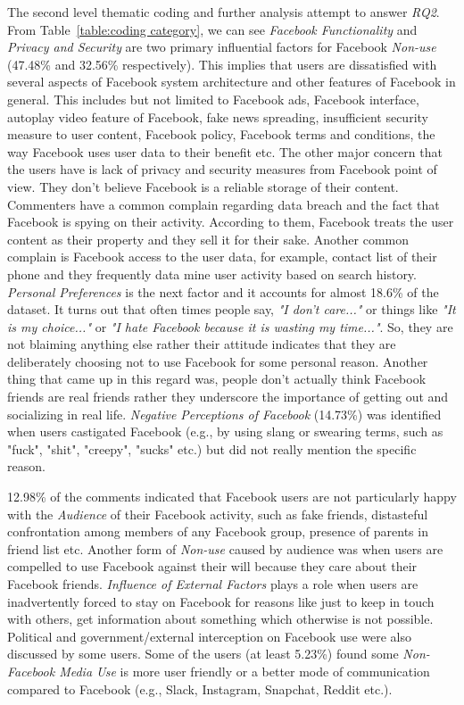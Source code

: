 The second level thematic coding and further analysis attempt to answer \emph{RQ2}. From Table~\ref{table:coding category}, we can see \textit{Facebook Functionality} and \textit{Privacy and Security} are two primary influential factors for Facebook \textit{Non-use} (47.48\% and 32.56\% respectively). This implies that users are dissatisfied with several aspects of Facebook system architecture and other features of Facebook in general. This includes but not limited to Facebook ads, Facebook interface, autoplay video feature of Facebook, fake news spreading, insufficient security measure to user content, Facebook policy, Facebook terms and conditions, the way Facebook uses user data to their benefit etc. The other major concern that the users have is lack of privacy and security measures from Facebook point of view. They don't believe Facebook is a reliable storage of their content. Commenters have a common complain regarding data breach and the fact that Facebook is spying on their activity. According to them, Facebook treats the user content as their property and they sell it for their sake. Another common complain is Facebook access to the user data, for example, contact list of their phone and they frequently data mine user activity based on search history. \textit{Personal Preferences} is the next factor and it accounts for almost 18.6\% of the dataset. It turns out that often times people say, \textit{"I don't care..."} or things like \textit{"It is my choice..."} or \textit{"I hate Facebook because it is wasting my time..."}. So, they are not blaiming anything else rather their attitude indicates that they are deliberately choosing not to use Facebook for some personal reason. Another thing that came up in this regard was, people don't actually think Facebook friends are real friends rather they underscore the importance of getting out and socializing in real life. \textit{Negative Perceptions of Facebook} (14.73\%) was identified when users castigated Facebook (e.g., by using slang or swearing terms, such as "fuck", "shit", "creepy", "sucks" etc.) but did not really mention the specific reason. 

12.98\% of the comments indicated that Facebook users are not particularly happy with the \textit{Audience} of their Facebook activity, such as fake friends, distasteful confrontation among members of any Facebook group, presence of parents in friend list etc. Another form of \textit{Non-use} caused by audience was when users are compelled to use Facebook against their will because they care about their Facebook friends. \textit{Influence of External Factors} plays a role when users are inadvertently forced to stay on Facebook for reasons like just to keep in touch with others, get information about something which otherwise is not possible. Political and government/external interception on Facebook use were also discussed by some users. Some of the users (at least 5.23\%) found some \textit{Non-Facebook Media Use} is more user friendly or a better mode of communication compared to Facebook (e.g., Slack, Instagram, Snapchat, Reddit etc.). 

